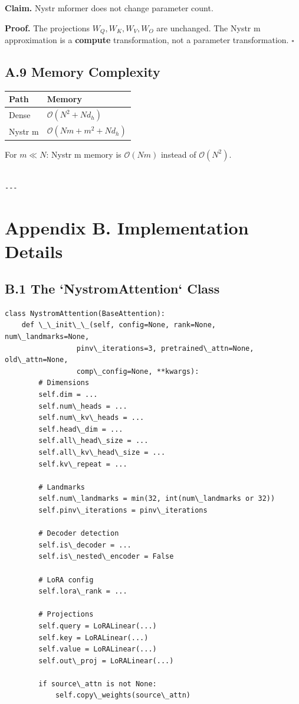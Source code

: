 \textbf{Claim.} Nystr mformer does not change parameter count.

\textbf{Proof.} The projections $W_Q, W_K, W_V, W_O$ are unchanged. The 
Nystr m approximation is a \textbf{compute} transformation, not a parameter 
transformation. $\square$

\subsection{A.9 Memory Complexity}

\begin{table}[H]
\centering
\small
\begin{tabular}{ll}
\toprule
\textbf{Path} & \textbf{Memory} \\
\midrule
Dense & $\mathcal{O}(N^2 + N d_h)$ \\
Nystr m & $\mathcal{O}(N m + m^2 + N d_h)$ \\
\bottomrule
\end{tabular}
\end{table}

For $m \ll N$: Nystr m memory is $\mathcal{O}(N m)$ instead of 
$\mathcal{O}(N^2)$.
\begin{lstlisting}

---
\end{lstlisting}


\section{Appendix B. Implementation Details}

\subsection{B.1 The `NystromAttention` Class}

\begin{lstlisting}
class NystromAttention(BaseAttention):
    def \_\_init\_\_(self, config=None, rank=None, num\_landmarks=None,
                 pinv\_iterations=3, pretrained\_attn=None, old\_attn=None,
                 comp\_config=None, **kwargs):
        # Dimensions
        self.dim = ...
        self.num\_heads = ...
        self.num\_kv\_heads = ...
        self.head\_dim = ...
        self.all\_head\_size = ...
        self.all\_kv\_head\_size = ...
        self.kv\_repeat = ...
        
        # Landmarks
        self.num\_landmarks = min(32, int(num\_landmarks or 32))
        self.pinv\_iterations = pinv\_iterations
        
        # Decoder detection
        self.is\_decoder = ...
        self.is\_nested\_encoder = False
        
        # LoRA config
        self.lora\_rank = ...
        
        # Projections
        self.query = LoRALinear(...)
        self.key = LoRALinear(...)
        self.value = LoRALinear(...)
        self.out\_proj = LoRALinear(...)
        
        if source\_attn is not None:
            self.copy\_weights(source\_attn)
\end{lstlisting}

